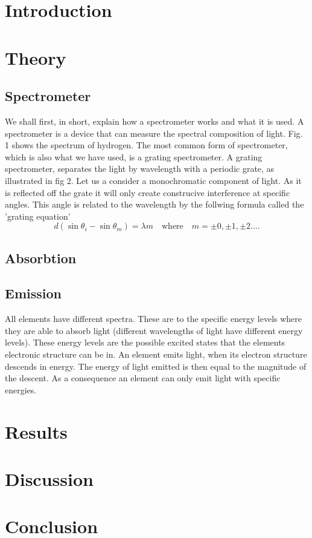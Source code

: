 \documentclass[working, oneside]{inputs/tuftebook}
\begin{document}
% 
\section*{Introduction}
\section*{Theory}
\subsection*{Spectrometer}
We shall first, in short, explain how a spectrometer works and what it is used. A spectrometer is a device that can measure the spectral composition of light. Fig. 1 shows the spectrum of hydrogen. The most common form of spectrometer, which is also what we have used, is a grating spectrometer. A grating spectrometer, separates the light by wavelength with a periodic grate, as illustrated in fig 2. Let us a consider a monochromatic component of light. As it is reflected off the grate it will only create construcive interference at specific angles. This angle is related to the wavelength by the follwing formula called the 'grating equation'
\[
d\left( \sin \theta_i - \sin \theta_m \right) = \lambda m \quad \text{where}\quad  m = \pm 0, \pm 1, \pm 2 \ldots
.\] 
\subsection*{Absorbtion}
\subsection*{Emission}
All elements have different spectra. These are to the specific energy levels where they are able to absorb light (different wavelengths of light have different energy levels). These energy levels are the possible excited states that the elements electronic structure can be in. An element emits light, when its electron structure descends in energy. The energy of light emitted is then equal to the magnitude of the descent. As a consequence an element can only emit light with specific energies.
\section*{Results}
\section*{Discussion}
\section*{Conclusion}
\end{document}

